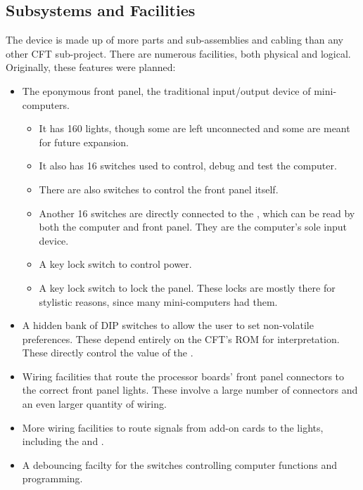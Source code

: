 \subsection{Subsystems and Facilities}

The device is made up of more parts and sub-assemblies and cabling
than any other CFT sub-project. There are numerous facilities, both
physical and logical. Originally, these features were planned:

\begin{itemize}

\item The eponymous front panel, the traditional input/output device
  of mini-computers.
  \begin{itemize}
  \item It has 160 lights, though some are left
    unconnected and some are meant for future expansion.
  \item It also has 16 switches used to control, debug and test the computer.
  \item There are also switches to control the front panel itself.
  \item Another 16 switches are directly connected to the ,
    which can be read by both the computer and front panel. They are
    the computer's sole input device.
  \item A key lock switch to control power.
  \item A key lock switch to lock the panel. These locks are mostly
    there for stylistic reasons, since many mini-computers had them.
  \end{itemize}

\item A hidden bank of DIP switches to allow the user to set
  non-volatile preferences. These depend entirely on the CFT's ROM for
  interpretation. These directly control the value of the .

\item Wiring facilities that route the processor boards' front panel
  connectors to the correct front panel lights. These involve a
  large number of connectors and an even larger quantity of wiring.
  
\item More wiring facilities to route signals from add-on cards to
  the lights, including the  and .

\item A debouncing facilty for the switches controlling computer
  functions and programming.


\end{itemize}
